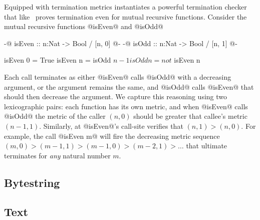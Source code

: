    Equipped with termination metrics
   \toolname instantiates a powerful
   termination checker that like~\citep{XiTerminationLICS01}
   proves termination even for mutual recursive functions.
   Consider the mutual recursive functions @isEven@ and @isOdd@
   \begin{code}
   {-@ isEven :: n:Nat -> Bool / [n, 0] @-}
   {-@ isOdd  :: n:Nat -> Bool / [n, 1] @-}
   
   isEven 0 = True
   isEven n = isOdd $ n-1
   
   isOdd n  = not $ isEven n 
   \end{code}
   Each call terminates as either @isEven@
   calls @isOdd@ with a decreasing argument, 
   or the argument remains the same, and @isOdd@
   calls @isEven@ that should then decrease the argument.
   We capture this reasoning using two lexicographic pairs:
   each function has its own metric, 
   and when @isEven@ calls @isOdd@
   the metric of the caller $(n, 0)$
   should be greater that callee's metric
   $(n-1, 1)$.
   Similarly, at @isEven@'s call-site 
   \toolname verifies that	
   $(n, 1) > (n, 0)$.
   For example, the call @isEven m@
   will fire the decreasing metric sequence
   $(m, 0) > (m-1, 1) > (m-1, 0) > (m-2, 1) > \dots$
   that ultimate terminates for \textit{any}
   natural number $m$.


\subsection{Bytestring}\label{sec:bytestring}


\subsection{Text}\label{sec:text}

